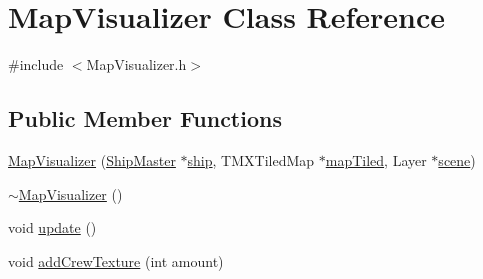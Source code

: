 \hypertarget{classMapVisualizer}{\section{Map\-Visualizer Class Reference}
\label{classMapVisualizer}
}


{\ttfamily \#include $<$Map\-Visualizer.\-h$>$}

\subsection*{Public Member Functions}
\begin{DoxyCompactItemize}
\item 
\hyperlink{classMapVisualizer_aa19d7369375404748df5c67d87f7bea2}{Map\-Visualizer} (\hyperlink{classShipMaster}{Ship\-Master} $\ast$\hyperlink{classMapVisualizer_aae41754a661628c88a957589e48b7b9e}{ship}, T\-M\-X\-Tiled\-Map $\ast$\hyperlink{classMapVisualizer_a8178bb6206e1d4f7eded58480e43d92c}{map\-Tiled}, Layer $\ast$\hyperlink{classMapVisualizer_a7fde95f09d1c8ef52b79e6d65d7c0b0c}{scene})
\item 
\hyperlink{classMapVisualizer_a0e1710c52a3cc31b1d7a173d522dce4a}{$\sim$\-Map\-Visualizer} ()
\item 
void \hyperlink{classMapVisualizer_ae5e795271c74d55aec34319a133c271c}{update} ()
\item 
void \hyperlink{classMapVisualizer_a5185365b1153687db34722d59ee380d2}{add\-Crew\-Texture} (int amount)
\end{DoxyCompactItemize}
